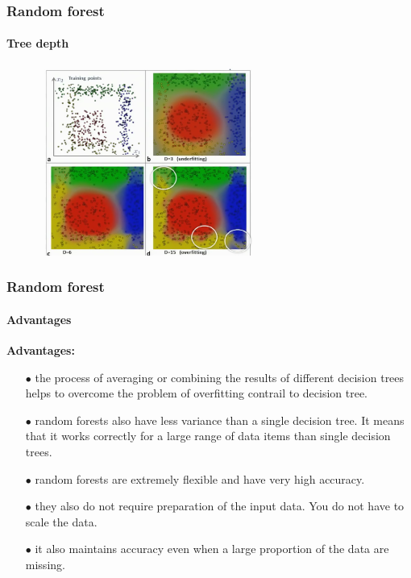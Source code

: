 \begin{frame}
	\frametitle{Random forest}
		\framesubtitle{Tree depth}
	
		\vfill
		
		\begin{figure}
			\includegraphics[width=7cm]{./figures/depth}
		\end{figure}

\end{frame}

\begin{frame}
	\frametitle{Random forest}
		\framesubtitle{Advantages}

		 \textbf{Advantages:}
		\begin{itemize}
		  \item[$\bullet$] the process of averaging or combining the results of different decision trees helps to overcome the problem of overfitting contrail to decision tree.
		  \item[$\bullet$] random forests also have less variance than a single decision tree. It means that it works correctly for a large range of data items than single decision trees.
		  \item[$\bullet$] random forests are extremely flexible and have very high accuracy.
		  \item[$\bullet$] they also do not require preparation of the input data. You do not have to scale the data.
		  \item[$\bullet$] it also maintains accuracy even when a large proportion of the data are missing.
		\end{itemize}

\end{frame}

